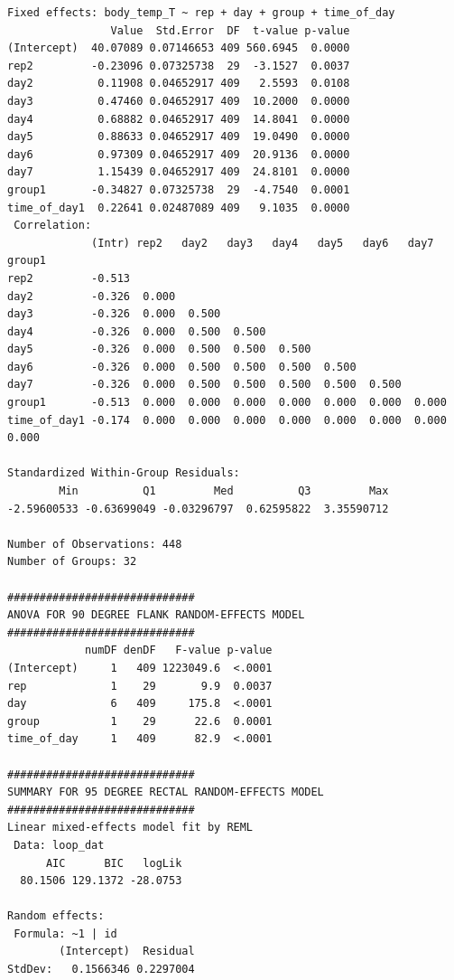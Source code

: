 \documentclass[a4paper, 10pt, titlepage]{article}
\begin{document}
\begin{lstlisting}[basicstyle = \footnotesize \ttfamily]
Fixed effects: body_temp_T ~ rep + day + group + time_of_day 
                Value  Std.Error  DF  t-value p-value
(Intercept)  40.07089 0.07146653 409 560.6945  0.0000
rep2         -0.23096 0.07325738  29  -3.1527  0.0037
day2          0.11908 0.04652917 409   2.5593  0.0108
day3          0.47460 0.04652917 409  10.2000  0.0000
day4          0.68882 0.04652917 409  14.8041  0.0000
day5          0.88633 0.04652917 409  19.0490  0.0000
day6          0.97309 0.04652917 409  20.9136  0.0000
day7          1.15439 0.04652917 409  24.8101  0.0000
group1       -0.34827 0.07325738  29  -4.7540  0.0001
time_of_day1  0.22641 0.02487089 409   9.1035  0.0000
 Correlation: 
             (Intr) rep2   day2   day3   day4   day5   day6   day7   group1
rep2         -0.513                                                        
day2         -0.326  0.000                                                 
day3         -0.326  0.000  0.500                                          
day4         -0.326  0.000  0.500  0.500                                   
day5         -0.326  0.000  0.500  0.500  0.500                            
day6         -0.326  0.000  0.500  0.500  0.500  0.500                     
day7         -0.326  0.000  0.500  0.500  0.500  0.500  0.500              
group1       -0.513  0.000  0.000  0.000  0.000  0.000  0.000  0.000       
time_of_day1 -0.174  0.000  0.000  0.000  0.000  0.000  0.000  0.000  0.000

Standardized Within-Group Residuals:
        Min          Q1         Med          Q3         Max 
-2.59600533 -0.63699049 -0.03296797  0.62595822  3.35590712 

Number of Observations: 448
Number of Groups: 32 

############################# 
ANOVA FOR 90 DEGREE FLANK RANDOM-EFFECTS MODEL 
#############################
            numDF denDF   F-value p-value
(Intercept)     1   409 1223049.6  <.0001
rep             1    29       9.9  0.0037
day             6   409     175.8  <.0001
group           1    29      22.6  0.0001
time_of_day     1   409      82.9  <.0001

############################# 
SUMMARY FOR 95 DEGREE RECTAL RANDOM-EFFECTS MODEL 
#############################
Linear mixed-effects model fit by REML
 Data: loop_dat 
      AIC      BIC   logLik
  80.1506 129.1372 -28.0753

Random effects:
 Formula: ~1 | id
        (Intercept)  Residual
StdDev:   0.1566346 0.2297004


\end{lstlisting}
\end{document}
